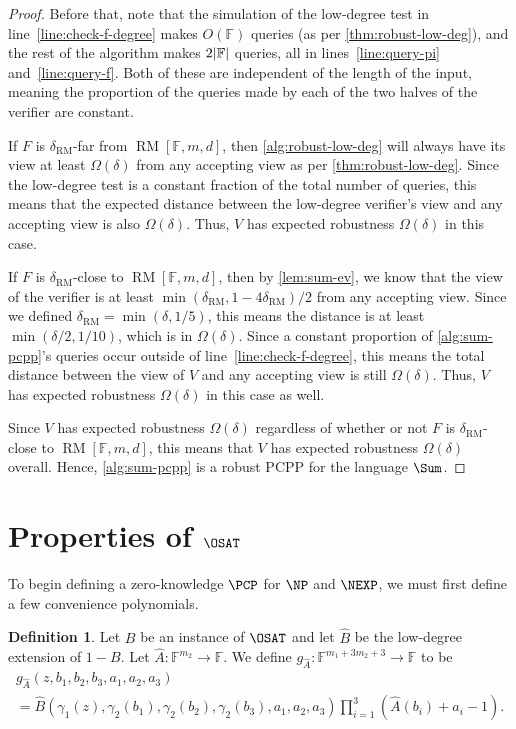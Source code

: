 \documentclass[english,12pt]{reedthesis}
\theoremstyle{plain}
\theoremstyle{definition}
\newtheorem{defn}[defn]{Definition}
\theoremstyle{remark}
\DeclareMathOperator{\RM}{RM}
\DeclarePairedDelimiter{\abs}{\lvert}{\rvert}
\begin{document}
\begin{proof}
  Before that, note that the simulation of the low-degree test in
  line~\ref{line:check-f-degree} makes $O(\mathbb{F})$ queries (as per
  \cref{thm:robust-low-deg}), and the rest of the algorithm makes
  $2\abs{\mathbb{F}}$ queries, all in lines~\ref{line:query-pi}
  and~\ref{line:query-f}. Both of these are independent of the length of the
  input, meaning the proportion of the queries made by each of the two halves of
  the verifier are constant.

  If $F$ is $\delta_{\RM}$-far from $\RM[\mathbb{F}, m, d]$, then
  \cref{alg:robust-low-deg} will always have its view at least $\Omega(\delta)$ from any
  accepting view as per \cref{thm:robust-low-deg}. Since the low-degree test is
  a constant fraction of the total number of queries, this means that the
  expected distance between the low-degree verifier's view and any accepting
  view is also $\Omega(\delta)$. Thus, $V$ has expected robustness $\Omega(\delta)$ in this case.

  If $F$ is $\delta_{\RM}$-close to $\RM[\mathbb{F}, m, d]$, then by
  \cref{lem:sum-ev}, we know that the view of the verifier is at least
  $\min(\delta_{\RM}, 1 - 4\delta_{\RM})/2$ from any accepting view. Since we defined
  $\delta_{\RM} = \min(\delta, 1/5)$, this means the distance is at least
  $\min(\delta/2, 1/10)$, which is in $\Omega(\delta)$. Since a constant proportion of
  \cref{alg:sum-pcpp}'s queries occur outside of line~\ref{line:check-f-degree},
  this means the total distance between the view of $V$ and any accepting view
  is still $\Omega(\delta)$. Thus, $V$ has expected robustness $\Omega(\delta)$ in this case as well.

  Since $V$ has expected robustness $\Omega(\delta)$ regardless of whether or not $F$ is
  $\delta_{\RM}$-close to $\RM[\mathbb{F}, m, d]$, this means that $V$ has expected
  robustness $\Omega(\delta)$ overall. Hence, \cref{alg:sum-pcpp} is a robust PCPP for
  the language $\Sum$.
\end{proof}

\section{Properties of $\OSAT$}

To begin defining a zero-knowledge $\PCP$ for $\NP$ and $\NEXP$, we must first
define a few convenience polynomials.

\begin{defn}\label{def:g_a}
  Let $B$ be an instance of $\OSAT$ and let $\hat{B}$ be the low-degree
  extension of $1 - B$. Let $\hat{A}\colon \mathbb{F}^{m_{2}} \rightarrow \mathbb{F}$. We
  define $g_{\hat{A}}\colon \mathbb{F}^{m_{1} + 3m_{2} + 3} \rightarrow \mathbb{F}$ to be
  \begin{multline}
    g_{\hat{A}}(z, b_{1}, b_{2}, b_{3}, a_{1}, a_{2}, a_{3}) \\ =
    \hat{B}(\gamma_{1}(z), \gamma_{2}(b_{1}), \gamma_{2}(b_{2}), \gamma_{2}(b_{3}), a_{1}, a_{2}, a_{3})
    \prod_{i=1}^{3}(\hat{A}(b_{i}) + a_{i} - 1).
  \end{multline}
\end{defn}
\end{document}
